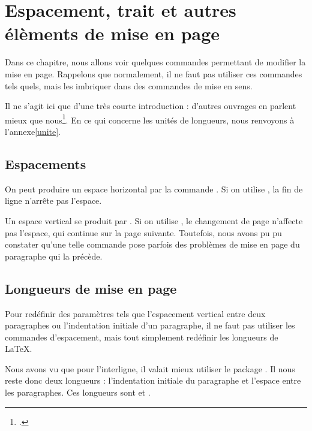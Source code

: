 \chapter{Espacement, trait et autres élèments de mise en page}\label{espacement}

\begin{prealable}
Dans ce chapitre, nous allons voir quelques commandes permettant de modifier la mise en page.
Rappelons que normalement, il ne faut pas utiliser ces commandes tels quels, mais les imbriquer dans des commandes de mise en sens.

Il ne s'agit ici que d'une très courte introduction : d'autres ouvrages en parlent mieux que nous\footcites(En particulier)(){frama}{latex_graphic_companion}.
En ce qui concerne les unités de longueurs, nous renvoyons à l'annexe\ref{unite}.
\end{prealable}

\section{Espacements}\label{espace}

On peut produire un espace horizontal par la commande . Si on utilise , la fin de ligne n'arrête pas l'espace.

Un espace vertical se produit par . Si on utilise , le changement de page n'affecte pas  l'espace, qui continue sur la page suivante. Toutefois, nous avons pu pu constater qu'une telle commande pose parfois des problèmes de mise en page du paragraphe qui la précède.



\section{Longueurs de mise en page}

Pour redéfinir des paramètres tels que l'espacement vertical entre deux paragraphes ou l'indentation initiale d'un paragraphe, il ne faut pas utiliser les commandes d'espacement, mais tout simplement redéfinir les longueurs de \LaTeX. 

Nous avons vu que pour l'interligne, il valait mieux utiliser le package . Il nous reste donc deux longueurs : l'indentation initiale du paragraphe et l'espace entre les paragraphes. Ces longueurs sont  et .

